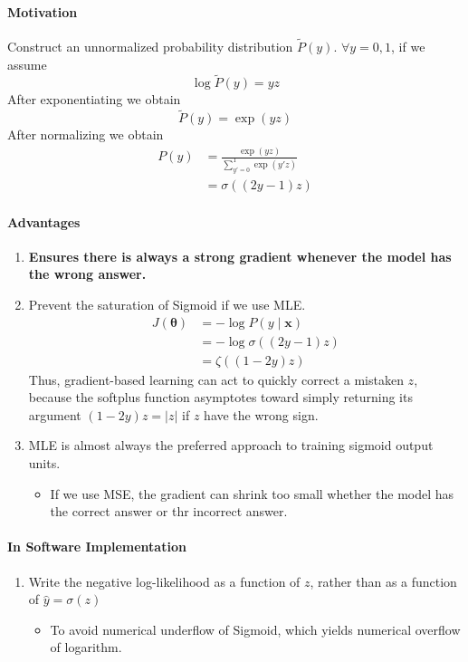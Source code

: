 \documentclass[12pt, a4paper]{article}
\def\vx{\boldsymbol{x}}
\def\vtheta{\boldsymbol{\theta}}
\begin{document}
\paragraph{Motivation}
Construct an unnormalized probability distribution $\tilde{P}(y)$. $\forall y=0,1$, if we assume 
\[
    \log \tilde{P}(y) = yz
\]
After exponentiating we obtain
\[
    \tilde{P}(y) = \exp (yz)
\]
After normalizing we obtain 
\[
    \begin{split}
        P(y) &= \frac{\exp(yz)}{\sum_{y'=0}^1 \exp(y'z)}
        \\&= \sigma ((2y-1)z)
    \end{split}
\]
\paragraph{Advantages}
\begin{enumerate}
    \item \textbf{Ensures there is always a strong gradient whenever the model has the wrong answer.}
    \item Prevent the saturation of Sigmoid if we use MLE.
        \[
            \begin{split}
                J(\vtheta) &= - \log P(y \mid \vx)
                \\&= - \log \sigma((2y-1)z)
                \\&= \zeta((1-2y)z)
            \end{split}
        \]
        Thus, gradient-based learning can act to quickly correct a mistaken $z$, because the softplus function asymptotes toward simply returning its argument $(1-2y)z = \vert z \vert$ if $z$ have the wrong sign.
    \item MLE is almost always the preferred approach to training sigmoid output units.
    \begin{itemize}
        \item If we use MSE, the gradient can shrink too small whether the model has the correct answer or thr incorrect answer.
    \end{itemize}
\end{enumerate}
\paragraph{In Software Implementation}
\begin{enumerate}
    \item Write the negative log-likelihood as a function of $z$, rather than as a function of $\hat{y} = \sigma(z)$
    \begin{itemize}
        \item To avoid numerical underflow of Sigmoid, which yields numerical overflow of logarithm.
    \end{itemize}
\end{enumerate}
\end{document}
